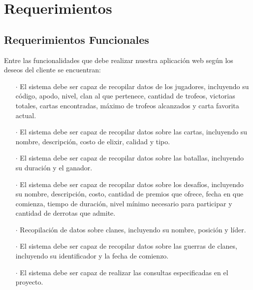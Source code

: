 %
%
%
%
\section{Requerimientos}

\subsection{Requerimientos Funcionales}

Entre las funcionalidades que debe realizar nuestra aplicación web según los deseos del cliente se encuentran:

\begin{enumerate}
  \item[\(\cdot\)] El sistema debe ser capaz de recopilar datos de los jugadores, incluyendo su código, apodo, nivel, clan al que pertenece, cantidad de trofeos, victorias totales, cartas encontradas, máximo de trofeos alcanzados y carta favorita actual.
  \item[\(\cdot\)] El sistema debe ser capaz de recopilar datos sobre las cartas, incluyendo su nombre, descripción, costo de elixir, calidad y tipo.
  \item[\(\cdot\)] El sistema debe ser capaz de recopilar datos sobre las batallas, incluyendo su duración y el ganador.
  \item[\(\cdot\)] El sistema debe ser capaz de recopilar datos sobre los desafíos, incluyendo su nombre, descripción, costo, cantidad de premios que ofrece, fecha en que comienza, tiempo de duración, nivel mínimo necesario para participar y cantidad de derrotas que admite.
  \item[\(\cdot\)] Recopilación de datos sobre clanes, incluyendo su nombre, posición y líder.
  \item[\(\cdot\)] El sistema debe ser capaz de recopilar datos sobre las guerras de clanes, incluyendo su identificador y la fecha de comienzo.
  \item[\(\cdot\)] El sistema debe ser capaz de realizar las consultas especificadas en el proyecto. 
\end{enumerate}

